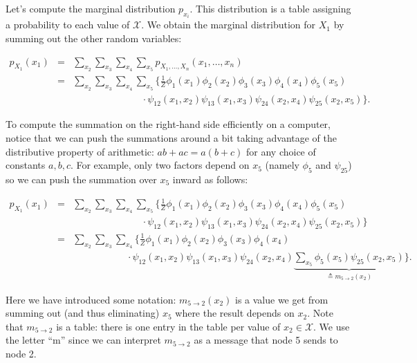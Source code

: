 \documentclass[6008notes.tex]{subfiles}
\begin{document}
Let's compute the marginal distribution $p_{x_i}$. This distribution is a table assigning a probability to each value of $\mathcal{X}$. We obtain the marginal distribution for $X_1$ by summing out the other random variables:

\begin{eqnarray*}
p_{X_{1}}(x_{1}) & = &\sum_{x_{2}}\sum_{x_{3}}\sum_{x_{4}}\sum_{x_{5}}p_{X_1,\dots,X_n}(x_1,\dots,x_n)\\
& = & \sum_{x_{2}}\sum_{x_{3}}\sum_{x_{4}}\sum_{x_{5}}
\bigg\{\frac{1}{Z}\phi_{1}(x_{1})\phi_{2}(x_{2})\phi_{3}(x_{3})\phi_{4}(x_{4})\phi_{5}(x_{5}) \\
& & \qquad\qquad\qquad\;\;\;\;
\cdot
\psi_{12}(x_{1},x_{2})\psi_{13}(x_{1},x_{3})\psi_{24}(x_{2},x_{4})\psi_{25}(x_{2},x_{5})\bigg\}.
\end{eqnarray*}

To compute the summation on the right-hand side efficiently on a computer, notice that we can push the summations around a bit taking advantage of the distributive property of arithmetic: $ab+ac=a(b+c)$ for any choice of constants $a,b,c$. For example, only two factors depend on $x_5$ (namely $\phi_5$ and $\psi_{25}$) so we can push the summation over $x_5$ inward as follows:

\begin{eqnarray*}
p_{X_{1}}(x_{1}) & = & \sum_{x_{2}}\sum_{x_{3}}\sum_{x_{4}}\sum_{x_{5}}
\bigg\{\frac{1}{Z}\phi_{1}(x_{1})\phi_{2}(x_{2})\phi_{3}(x_{3})\phi_{4}(x_{4})\phi_{5}(x_{5}) \\
& & \qquad\qquad\qquad\;\;\;\;
\cdot \psi_{12}(x_{1},x_{2})\psi_{13}(x_{1},x_{3})\psi_{24}(x_{2},x_{4})\psi_{25}(x_{2},x_{5}) \bigg\} \\
& = & \sum_{x_{2}}\sum_{x_{3}}\sum_{x_{4}}
\bigg\{\frac{1}{Z}\phi_{1}(x_{1})\phi_{2}(x_{2})\phi_{3}(x_{3})\phi_{4}(x_{4}) \\
& & \qquad\qquad\quad\;\;
\cdot \psi_{12}(x_{1},x_{2})\psi_{13}(x_{1},x_{3})\psi_{24}(x_{2},x_{4})\underbrace{\sum_{x_{5}}\phi_{5}(x_{5})\psi_{25}(x_{2},x_{5})}_{\triangleq m_{5 \rightarrow 2}(x_{2})} \bigg\}.
\end{eqnarray*}

Here we have introduced some notation: $m_{5\rightarrow 2}(x_{2})$ is a value we get from summing out (and thus eliminating) $x_5$ where the result depends on $x_2$. Note that $m_{5\rightarrow 2}$ is a table: there is one entry in the table per value of $x_{2}\in \mathcal{X}$. We use the letter ``m'' since we can interpret $m_{5\rightarrow 2}$ as a message that node 5 sends to node 2.
\end{document}
